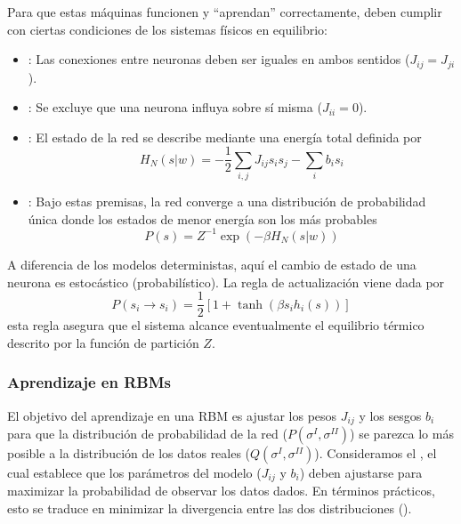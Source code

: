 \noindent
Para que estas máquinas funcionen y ``aprendan'' correctamente, deben cumplir con ciertas condiciones de los sistemas físicos en equilibrio:
\begin{itemize}
    \item {}: Las conexiones entre neuronas deben ser iguales en ambos sentidos ($J_{ij} = J_{ji}$).
    \item {}: Se excluye que una neurona influya sobre sí misma ($J_{ii} = 0$).
    \item {}: El estado de la red se describe mediante una energía total definida por
    \begin{equation}
        H_N(s|w) = -\frac{1}{2} \sum_{i,j} J_{ij} s_i s_j - \sum_i b_i s_i \label{eq:hamiltoniano_RBM}
    \end{equation}
    \item {}: Bajo estas premisas, la red converge a una distribución de probabilidad única donde los estados de menor energía son los más probables
    \begin{equation*}
        P(s) = Z^{-1} \exp(-\beta H_N(s|w))
    \end{equation*}
\end{itemize}

\noindent
A diferencia de los modelos deterministas, aquí el cambio de estado de una neurona es estocástico (probabilístico). La regla de actualización viene dada por
\begin{equation*}
    P(s_i \to s_i) = \frac{1}{2} [1 + \tanh(\beta s_i h_i(s))]
\end{equation*}
esta regla asegura que el sistema alcance eventualmente el equilibrio térmico descrito por la función de partición $Z$.

\subsubsection{Aprendizaje en RBMs}
\noindent
El objetivo del aprendizaje en una RBM es ajustar los pesos $J_{ij}$ y los sesgos $b_i$ para que la distribución de probabilidad de la red ($P(\sigma^I, \sigma^{II})$) se parezca lo más posible a la distribución de los datos reales ($Q(\sigma^I, \sigma^{II})$). Consideramos el , el cual establece que los parámetros del modelo ($J_{ij}$ y $b_i$) deben ajustarse para maximizar la probabilidad de observar los datos dados. En términos prácticos, esto se traduce en minimizar la divergencia entre las dos distribuciones (). \\

